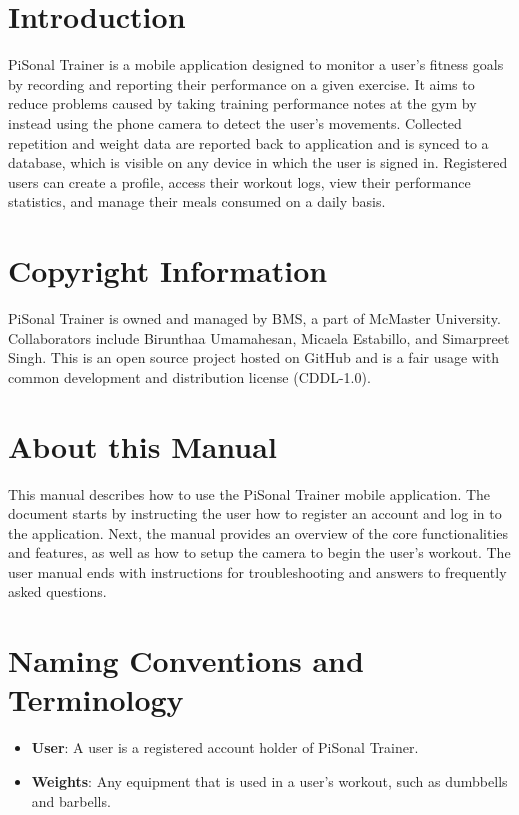 \documentclass{article}
\begin{document}
\section{Introduction}
PiSonal Trainer is a mobile application designed to monitor a user's fitness goals by recording and reporting their performance on a given exercise. It aims to reduce problems caused by taking training performance notes at the gym by instead using the phone camera to detect the user's movements. Collected repetition and weight data are reported back to application and is synced to a database, which is visible on any device in which the user is signed in. Registered users can create a profile, access their workout logs, view their performance statistics, and manage their meals consumed on a daily basis.

\section{Copyright Information}
PiSonal Trainer is owned and managed by BMS, a part of McMaster University. Collaborators include Birunthaa Umamahesan, Micaela Estabillo, and Simarpreet Singh. This is an open source project hosted on GitHub and is a fair usage with common development and distribution license (CDDL-1.0).

\section{About this Manual}
This manual describes how to use the PiSonal Trainer mobile application. The document starts by instructing the user how to register an account and log in to the application. Next, the manual provides an overview of the core functionalities and features, as well as how to setup the camera to begin the user's workout. The user manual ends with instructions for troubleshooting and answers to frequently asked questions. 

\section{Naming Conventions and Terminology}
\begin{itemize}

    \item \textbf{User}: A user is a registered account holder of PiSonal Trainer. 

    \item \textbf{Weights}: Any equipment that is used in a user's workout, such as dumbbells and barbells.

\end{itemize}
\end{document}
